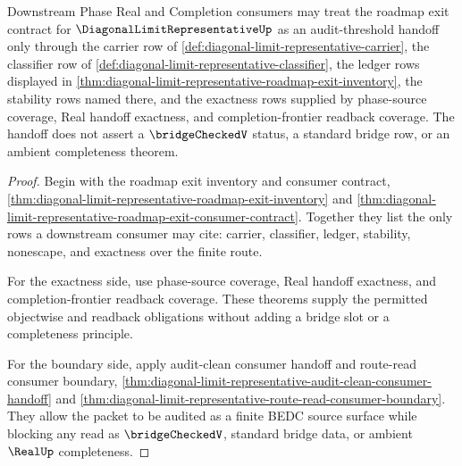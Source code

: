\begin{theorem}
\label{thm:diagonal-limit-representative-exit-audit-threshold}
Downstream Phase Real and Completion consumers may treat the roadmap exit contract for $\DiagonalLimitRepresentativeUp$ as an audit-threshold handoff only through the carrier row of \autoref{def:diagonal-limit-representative-carrier}, the classifier row of \autoref{def:diagonal-limit-representative-classifier}, the ledger rows displayed in \autoref{thm:diagonal-limit-representative-roadmap-exit-inventory}, the stability rows named there, and the exactness rows supplied by phase-source coverage, Real handoff exactness, and completion-frontier readback coverage. The handoff does not assert a $\bridgeCheckedV$ status, a standard bridge row, or an ambient completeness theorem.
\end{theorem}
\begin{proof}
Begin with the roadmap exit inventory and consumer contract, \autoref{thm:diagonal-limit-representative-roadmap-exit-inventory} and \autoref{thm:diagonal-limit-representative-roadmap-exit-consumer-contract}. Together they list the only rows a downstream consumer may cite: carrier, classifier, ledger, stability, nonescape, and exactness over the finite route.

For the exactness side, use phase-source coverage, Real handoff exactness, and completion-frontier readback coverage. These theorems supply the permitted objectwise and readback obligations without adding a bridge slot or a completeness principle.

For the boundary side, apply audit-clean consumer handoff and route-read consumer boundary, \autoref{thm:diagonal-limit-representative-audit-clean-consumer-handoff} and \autoref{thm:diagonal-limit-representative-route-read-consumer-boundary}. They allow the packet to be audited as a finite BEDC source surface while blocking any read as $\bridgeCheckedV$, standard bridge data, or ambient $\RealUp$ completeness.
\end{proof}

